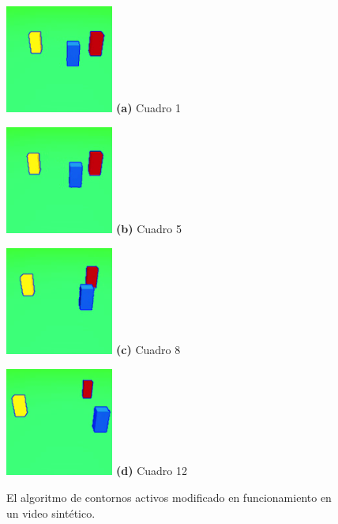 \begin{figure}[H]
    \centering
    \begin{minipage}[t]{.25\textwidth}
      \includegraphics[width=1.4in]{./images/cropped_processing2.png}
      \centering
      \footnotesize
      \textbf{(a)} Cuadro 1
    \end{minipage}
    \hspace{-0.3cm}
    \begin{minipage}[t]{.25\textwidth}
      \includegraphics[width=1.4in]{./images/cropped_processing5.png}
      \centering
      \footnotesize
      \textbf{(b)} Cuadro 5
    \end{minipage}
    \hspace{-0.3cm}
    \begin{minipage}[t]{.25\textwidth}
      \includegraphics[width=1.4in]{./images/cropped_processing14.png}
      \centering
      \footnotesize
      \textbf{(c)} Cuadro 8
    \end{minipage}
    \hspace{-0.3cm}
    \begin{minipage}[t]{.25\textwidth}
      \includegraphics[width=1.4in]{./images/cropped_processing25.png}
      \centering
      \footnotesize
      \textbf{(d)} Cuadro 12
    \end{minipage}
    \caption{El algoritmo de contornos activos modificado en funcionamiento en un video sintético.
    \label{fig:happy-occluded-activeContour}
    }
\end{figure}

